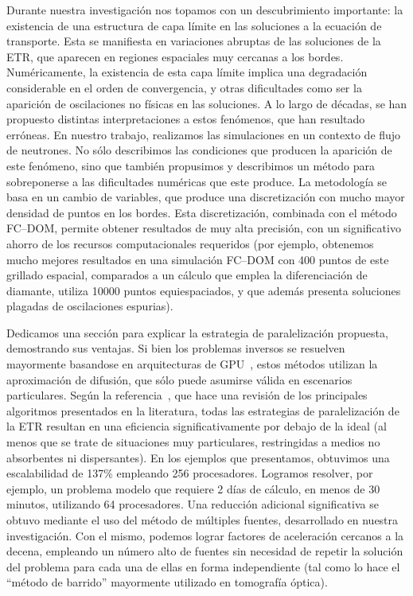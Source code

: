 Durante nuestra investigación nos topamos con un descubrimiento importante: 
la existencia de una estructura de capa límite en las soluciones a la 
ecuación de transporte. Esta se manifiesta en variaciones abruptas 
de las soluciones de la ETR, que aparecen en regiones espaciales 
muy cercanas a los bordes. 
Numéricamente, la existencia de esta capa límite implica una 
degradación considerable en el orden de convergencia, y otras dificultades 
como ser la aparición de oscilaciones no físicas en las soluciones. 
A lo largo de décadas, se han propuesto distintas interpretaciones a 
estos fenómenos, que han resultado erróneas.
En nuestro trabajo, realizamos las simulaciones en un contexto de flujo 
de neutrones. 
No sólo describimos las condiciones que producen la aparición de 
este fenómeno, sino que también propusimos y describimos un método 
para sobreponerse a las dificultades numéricas que este produce. 
La metodología se basa en un cambio de 
variables, que produce una discretización con mucho mayor densidad de 
puntos en los bordes. Esta discretización, combinada con el método FC--DOM, 
permite obtener resultados de muy alta precisión, con un significativo 
ahorro de los recursos computacionales requeridos (por ejemplo, 
obtenemos mucho mejores resultados en una simulación FC--DOM con 400 puntos de 
este grillado espacial, comparados a un cálculo que emplea la diferenciación de 
diamante, utiliza 10000 puntos equiespaciados, y que además presenta 
soluciones plagadas de oscilaciones espurias).

Dedicamos una sección para explicar la 
estrategia de paralelización propuesta, demostrando sus ventajas.
Si bien los problemas inversos se resuelven mayormente basandose 
en arquitecturas de GPU~\cite{Doulgerakis2017}, estos métodos 
utilizan la aproximación de difusión, que sólo puede asumirse 
válida en escenarios particulares. 
Según la referencia~\cite{Coelho2014}, que hace una revisión de los 
principales algoritmos presentados en la literatura, 
todas las estrategias de paralelización de la ETR resultan en una 
eficiencia significativamente por debajo de la ideal (al menos que se 
trate de situaciones muy particulares, restringidas a medios no 
absorbentes ni dispersantes).
En los ejemplos que presentamos, obtuvimos una escalabilidad de 
137\% empleando 256 procesadores. Logramos resolver, por ejemplo, 
un problema modelo que requiere 2 días de cálculo, en menos de 30 minutos, 
utilizando 64 procesadores.
Una reducción adicional significativa se obtuvo mediante el uso 
del método de múltiples fuentes, desarrollado en nuestra investigación.
Con el mismo, podemos lograr factores de aceleración cercanos a la 
decena, empleando un número alto de fuentes sin necesidad de 
repetir la solución del problema para cada una de ellas en forma 
independiente (tal como lo hace el ``método de barrido'' 
mayormente utilizado en tomografía óptica).

